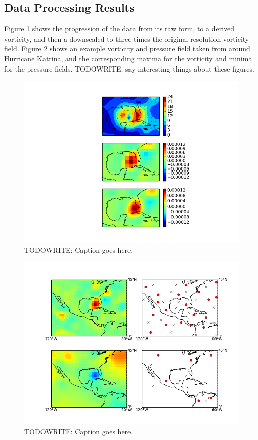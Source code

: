 \documentclass[pdftex,12pt,a4paper]{report}
\begin{document}
\subsection{Data Processing Results}

Figure \ref{fig:katrina_data_proc} shows the progression of the data from its raw form, to a derived
vorticity, and then a downscaled to three times the original resolution vorticity field. Figure
\ref{fig:katrina_max_mins} shows an example vorticity and pressure field taken from around Hurricane
Katrina, and the corresponding maxima for the vorticity and minima for the pressure fields.
TODOWRITE:
say interesting things about these figures.

\begin{figure}[hbp]
    \centering
    \includegraphics[width=\textwidth]{figures/katrina_data_proc}
    \caption{TODOWRITE: Caption goes here.}
    \label{fig:katrina_data_proc}
\end{figure}

\begin{figure}[hbp]
    \centering
    \includegraphics[width=\textwidth]{figures/katrina_max_mins}
    \caption{TODOWRITE: Caption goes here.}
    \label{fig:katrina_max_mins}
\end{figure}
\end{document}
